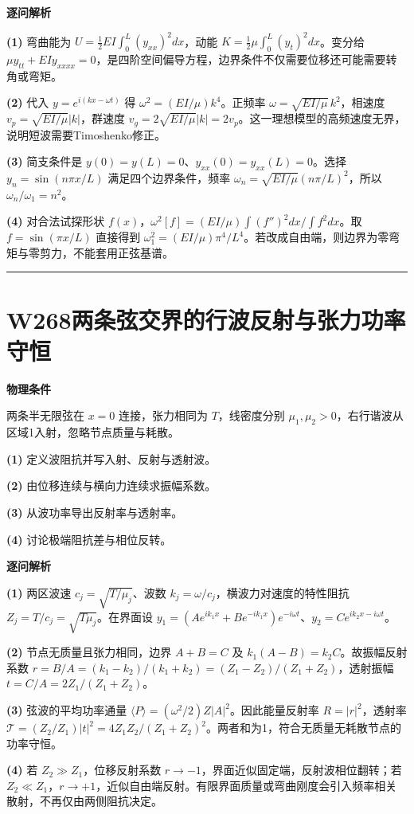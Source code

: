\documentclass[UTF8,a4paper,11pt,oneside,openany]{ctexbook}
\begin{document}
\par\medskip\noindent\textbf{逐问解析}
\par\noindent\textbf{(1)} 弯曲能为 \(U=\tfrac12EI\int_0^L(y_{xx})^2dx\)，动能 \(K=\tfrac12\mu\int_0^L(y_t)^2dx\)。变分给 \(\mu y_{tt}+EIy_{xxxx}=0\)，是四阶空间偏导方程，边界条件不仅需要位移还可能需要转角或弯矩。
\par\noindent\textbf{(2)} 代入 \(y=e^{i(kx-\omega t)}\) 得 \(\omega^2=(EI/\mu)k^4\)。正频率 \(\omega=\sqrt{EI/\mu}\,k^2\)，相速度 \(v_p=\sqrt{EI/\mu}|k|\)，群速度 \(v_g=2\sqrt{EI/\mu}|k|=2v_p\)。这一理想模型的高频速度无界，说明短波需要Timoshenko修正。
\par\noindent\textbf{(3)} 简支条件是 \(y(0)=y(L)=0\)、\(y_{xx}(0)=y_{xx}(L)=0\)。选择 \(y_n=\sin(n\pi x/L)\) 满足四个边界条件，频率 \(\omega_n=\sqrt{EI/\mu}(n\pi/L)^2\)，所以 \(\omega_n/\omega_1=n^2\)。
\par\noindent\textbf{(4)} 对合法试探形状 \(f(x)\)，\(\omega^2[f]=(EI/\mu)\int(f'')^2dx/\int f^2dx\)。取 \(f=\sin(\pi x/L)\) 直接得到 \(\omega_1^2=(EI/\mu)\pi^4/L^4\)。若改成自由端，则边界为零弯矩与零剪力，不能套用正弦基谱。

\par\bigskip\hrule\bigskip
\section*{W268\quad 两条弦交界的行波反射与张力功率守恒}
\textbf{物理条件}\par 两条半无限弦在 \(x=0\) 连接，张力相同为 \(T\)，线密度分别 \(\mu_1,\mu_2>0\)，右行谐波从区域1入射，忽略节点质量与耗散。
\par\noindent\textbf{(1)} 定义波阻抗并写入射、反射与透射波。
\par\noindent\textbf{(2)} 由位移连续与横向力连续求振幅系数。
\par\noindent\textbf{(3)} 从波功率导出反射率与透射率。
\par\noindent\textbf{(4)} 讨论极端阻抗差与相位反转。

\par\medskip\noindent\textbf{逐问解析}
\par\noindent\textbf{(1)} 两区波速 \(c_j=\sqrt{T/\mu_j}\)、波数 \(k_j=\omega/c_j\)，横波力对速度的特性阻抗 \(Z_j=T/c_j=\sqrt{T\mu_j}\)。在界面设 \(y_1=(Ae^{ik_1x}+Be^{-ik_1x})e^{-i\omega t}\)、\(y_2=Ce^{ik_2x-i\omega t}\)。
\par\noindent\textbf{(2)} 节点无质量且张力相同，边界 \(A+B=C\) 及 \(k_1(A-B)=k_2C\)。故振幅反射系数 \(r=B/A=(k_1-k_2)/(k_1+k_2)=(Z_1-Z_2)/(Z_1+Z_2)\)，透射振幅 \(t=C/A=2Z_1/(Z_1+Z_2)\)。
\par\noindent\textbf{(3)} 弦波的平均功率通量 \(\langle P\rangle=(\omega^2/2)Z|A|^2\)。因此能量反射率 \(R=|r|^2\)，透射率 \(\mathcal T=(Z_2/Z_1)|t|^2=4Z_1Z_2/(Z_1+Z_2)^2\)。两者和为1，符合无质量无耗散节点的功率守恒。
\par\noindent\textbf{(4)} 若 \(Z_2\gg Z_1\)，位移反射系数 \(r\to-1\)，界面近似固定端，反射波相位翻转；若 \(Z_2\ll Z_1\)，\(r\to+1\)，近似自由端反射。有限界面质量或弯曲刚度会引入频率相关散射，不再仅由两侧阻抗决定。
\end{document}
